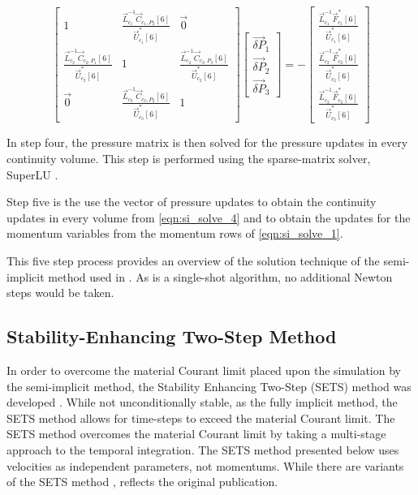   \begin{equation}
 \label{eqn:si_pressure_matrix}
 \begin{bmatrix} 
 1 & \frac{\vec{L}^{-1}_{c_1}\vec{C}_{c_1,P_2}[6]}{\vec{U}^{*}_{c_1}[6]} & \vec{0} \\
 \frac{\vec{L}^{-1}_{c_2}\vec{C}_{c_2,P_1}[6]}{\vec{U}^{*}_{c_2}[6]} & 1 & \frac{\vec{L}^{-1}_{c_2}\vec{C}_{c_2,P_3}[6]}{\vec{U}^{*}_{c_2}[6]} \\
 \vec{0}           & \frac{\vec{L}^{-1}_{c_3}\vec{C}_{c_3,P_2}[6]}{\vec{U}^{*}_{c_3}[6]} & 1
 \end{bmatrix} \begin{bmatrix}
 \vec{\delta P}_{1} \\
 \vec{\delta P}_{2} \\
 \vec{\delta P}_{3}
\end{bmatrix}  = -\begin{bmatrix}
 \frac{\vec{L}^{-1}_{c_1}\vec{F}^{*}_{c_1}[6]}{\vec{U}^{*}_{c_1}[6]} \\
 \frac{\vec{L}^{-1}_{c_2}\vec{F}^{*}_{c_2}[6]}{\vec{U}^{*}_{c_2}[6]} \\
 \frac{\vec{L}^{-1}_{c_3}\vec{F}^{*}_{c_3}[6]}{\vec{U}^{*}_{c_3}[6]}
\end{bmatrix}
 \end{equation}

In step four, the pressure matrix is then solved for the pressure updates in every continuity volume.
This step is performed using the sparse-matrix solver, SuperLU \cite{Li1999}. 

Step five is the use the vector of pressure updates to obtain the continuity updates in every volume from \eqref{eqn:si_solve_4} and to obtain the updates for the momentum variables from the momentum rows of \eqref{eqn:si_solve_1}.

This five step process provides an overview of the solution technique of the semi-implicit method used in \cobra{}.
As \cobra{} is a single-shot algorithm, no additional Newton steps would be taken.

\subsection{Stability-Enhancing Two-Step Method} 
\label{subsect:numerics_sets}
In order to overcome the material Courant limit placed upon the simulation by the semi-implicit method, the Stability Enhancing Two-Step (SETS) method was developed \cite{Mahaffy1982}.
While not unconditionally stable, as the fully implicit method, the SETS method allows for time-steps to exceed the material Courant limit.
The SETS method overcomes the material Courant limit by taking a multi-stage approach to the temporal integration.
The SETS method presented below uses velocities as independent parameters, not momentums.
While there are variants of the SETS method \cite{TRACE},  reflects the original publication.

